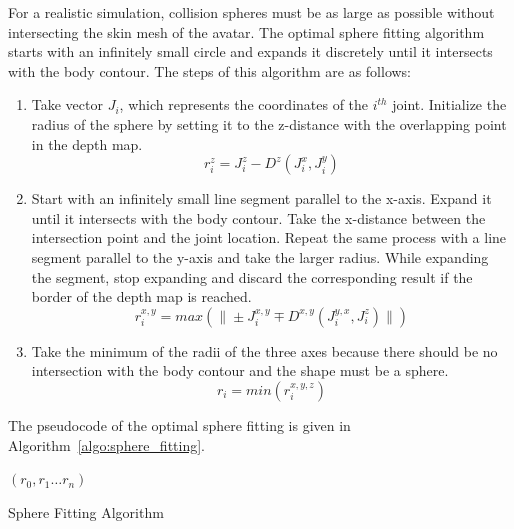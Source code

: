\documentclass[number,preprint,review,12pt]{elsarticle}
\begin{document}
For a realistic simulation, collision spheres must be as large as possible without intersecting the skin mesh of the avatar. The optimal sphere fitting algorithm starts with an infinitely small circle and expands it discretely until it intersects with the body contour. The steps of this algorithm are as follows:  

\begin{enumerate}
\item Take vector $J_i$, which represents the coordinates of the $i^{th}$ joint.
Initialize the radius of the sphere by setting it to the z-distance with the overlapping point in the depth map.
\begin{equation}
r_i^z=J_i^z-D^z(J_i^x,J_i^y)
\label{eqn:z_sphere_radius}
\end{equation}
\item Start with an infinitely small line segment parallel to the x-axis. Expand it until it intersects with the body contour. Take the x-distance between the intersection point and the joint location. Repeat the same process with a line segment parallel to the y-axis and take the larger radius. While expanding the segment, stop expanding and discard the corresponding result if the border of the depth map is reached.
\begin{equation}
r_i^{x,y}=max(\| \pm J_i^{x,y} \mp D^{x,y}(J_i^{y,x},J_i^z)\|)
\label{eqn:x_y_sphere_radius}
\end{equation}
\item Take the minimum of the radii of the three axes because there should be no intersection with the body contour and the shape must be a sphere.
\begin{equation}
r_i=min(r_i^{x,y,z})
\label{eqn:minimum_sphere-radius}
\end{equation}
\end{enumerate}

\noindent The pseudocode of the optimal sphere fitting is given in Algorithm~\ref{algo:sphere_fitting}.

\singlespacing

\begin{algorithm}
\DontPrintSemicolon 
{}
\Return $(r_0,r_1 \ldots r_n)$ 
\caption{Sphere Fitting Algorithm}
\label{algo:sphere_fitting}
\end{algorithm}  
\end{document}
